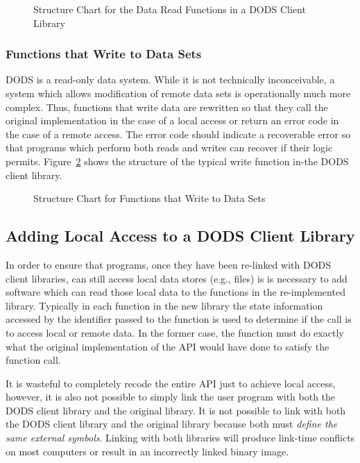 \begin{figure}
\centerline{}
\caption{Structure Chart for the Data Read Functions in a DODS Client Library}
\label{fig:client-read}
\end{figure}

\subsubsection{Functions that Write to Data Sets}

DODS is a read-only data system. While it is not technically inconceivable, a
system which allows modification of remote data sets is operationally much
more complex. Thus, functions that write data are rewritten so that they call
the original implementation in the case of a local access or return an error
code in the case of a remote access. The error code should indicate a
recoverable error so that programs which perform both reads and writes can
recover if their logic permits. Figure~\ref{fig:client-write} shows the
structure of the typical write function in-the DODS client library.

\begin{figure}
\centerline{}
\caption{Structure Chart for Functions that Write to Data Sets}
\label{fig:client-write}
\end{figure}

\subsection{Adding Local Access to a DODS Client Library}

In order to ensure that programs, once they have been re-linked with DODS
client libraries, can still access local data stores (e.g., files) is is
necessary to add software which can read those local data to the functions
in the re-implemented library. Typically in each function in the new library
the state information accessed by the identifier passed to the function is
used to determine if the call is to access local or remote data. In the
former case, the function must do exactly what the original implementation
of the API would have done to satisfy the function call. 

It is wasteful to completely recode the entire API just to achieve local
access, however, it is also not possible to simply link the user program with
both the DODS client library and the original library. It is not possible to
link with both the DODS client library and the original library because both
must {\em define the same external symbols}. Linking with both libraries
will produce link-time conflicts on most computers or result in an
incorrectly linked binary image.

